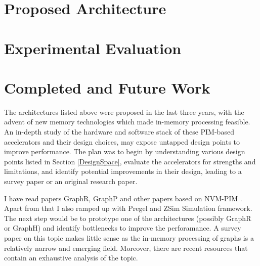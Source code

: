 \documentclass[journal,onecolumn]{IEEEtran}
\begin{document}
\section{Proposed Architecture}

\section{Experimental Evaluation}

\section{Completed and Future Work}

The architectures listed above were proposed in the last three years, with the advent of new memory technologies which made in-memory processing feasible. An in-depth study of the hardware and software stack of these PIM-based accelerators and their design choices, may expose untapped design points to improve performance. The plan was to begin by understanding various design points listed in Section \ref{DesignSpace}, evaluate the accelerators for strengths and limitations, and identify potential improvements in their design, leading to a survey paper or an original research paper.

I have read papers GraphR\cite{GraphR}, GraphP\cite{GraphP} and other papers based on NVM-PIM \cite{k-means}. Apart from that I also ramped up with Pregel and ZSim Simulation framework. The next step would be to prototype one of the architectures (possibly GraphR or GraphH) and identify bottlenecks to improve the perforamance. A survey paper on this topic makes little sense as the in-memory processing of graphs is a relatively narrow and emerging field. Moreover, there are recent resources \cite{BGA-book, SG-MT} that contain an exhaustive analysis of the topic.

%
%
\end{document}
